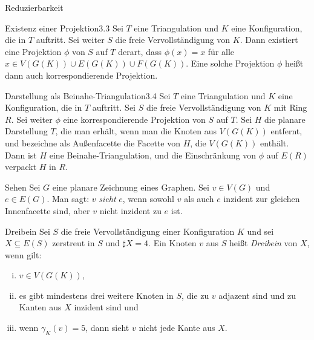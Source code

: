 \begin{section}{Reduzierbarkeit}
 \begin{satzl}{Existenz einer Projektion}{3.3}
  Sei $T$ eine Triangulation und $K$ eine Konfiguration, die in $T$ auftritt. Sei weiter $S$ die freie Vervollständigung von $K$. Dann existiert eine Projektion $\phi$ von $S$ auf $T$ derart, dass $\phi(x) = x$ für alle $x\in V(G(K)) \cup E(G(K)) \cup F(G(K))$. Eine solche Projektion $\phi$ heißt dann auch korrespondierende Projektion.
 \end{satzl}
 
 \begin{satzl}{Darstellung als Beinahe-Triangulation}{3.4}
  Sei $T$ eine Triangulation und $K$ eine Konfiguration, die in $T$ auftritt. Sei $S$ die freie Vervollständigung von $K$ mit Ring $R$. Sei weiter $\phi$ eine korrespondierende Projektion von $S$ auf $T$. Sei $H$ die planare Darstellung $T$, die man erhält, wenn man die Knoten aus $V(G(K))$ entfernt, und bezeichne als Außenfacette die Facette von $H$, die $V(G(K))$ enthält. Dann ist $H$ eine Beinahe-Triangulation, und die Einschränkung von $\phi$ auf $E(R)$ verpackt $H$ in $R$.  
 \end{satzl}

 \begin{definition}{Sehen}
  Sei $G$ eine planare Zeichnung eines Graphen. Sei $v \in V(G)$ und $e \in E(G)$. Man sagt: $v$ \textit{sieht} $e$, wenn sowohl $v$ als auch $e$ inzident zur gleichen Innenfacette sind, aber $v$ nicht inzident zu $e$ ist.
 \end{definition}

 \begin{definition}{Dreibein}
  Sei $S$ die freie Vervollständigung einer Konfiguration $K$ und sei $X \subseteq E(S)$ zerstreut in $S$ und $\sharp X = 4$. Ein Knoten $v$ aus $S$ heißt \textit{Dreibein} von $X$, wenn gilt:
  \begin{enumerate}[(i)]
   \item $v \in V(G(K))$,
   \item es gibt mindestens drei weitere Knoten in $S$, die zu $v$ adjazent sind und zu Kanten aus $X$ inzident sind und
   \item wenn $\gamma_K(v) = 5$, dann sieht $v$ nicht jede Kante aus $X$.
  \end{enumerate}
 \end{definition}
 

\end{section}

